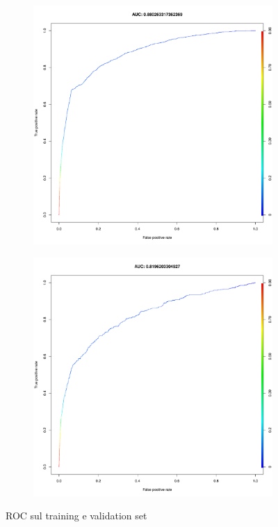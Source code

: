\begin{figure}[H]
	\centering
	\begin{subfigure}[t]{1\textwidth}
		\begin{minipage}[t]{0.475\textwidth}
			\includegraphics[width=\textwidth]{images/ml/svm/HoldoutSVM/auc_train}
			\label{fig:svm_h_roc_train} 
		\end{minipage}
		\hfill
		\begin{minipage}[t]{0.475\textwidth}
			\includegraphics[width=\textwidth]{images/ml/svm/HoldoutSVM/auc_test}
			\label{fig:svm_h_roc_test} 
		\end{minipage}
	\end{subfigure}
	\caption{ROC sul training e validation set}
	\label{fig:svm_h_roc}
\end{figure}

